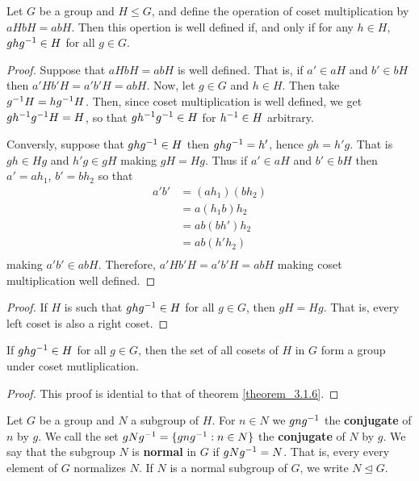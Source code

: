 \begin{theorem}\label{theorem_3.2.3}
  Let $G$ be a group and  $H \leq G$, and define the operation of coset
  multiplication by  $aHbH=abH$. Then this opertion is well defined if, and
  only if for any  $h \in H$,  $ghg^{-1} \in H$ for all $g \in G$.
\end{theorem}
\begin{proof}
  Suppose that $aHbH=abH$ is well defined. That is, if  $a' \in aH$ and $b'
  \in bH$ then  $a'Hb'H=a'b'H=abH$. Now, let  $g \in G$ and  $h \in H$. Then
  take $g^{-1}H=hg^{-1}H$. Then, since coset multiplication is well defined,
  we get $gh^{-1}g^{-1}H=H$, so that $gh^{-1}g^{-1} \in H$ for $h^{-1} \in
  H$ arbitrary.

  Conversly, suppose that $ghg^{-1} \in H$ then $ghg^{-1}=h'$, hence
  $gh=h'g$. That is  $gh \in Hg$ and  $h'g \in gH$ making  $gH=Hg$. Thus if
  $a' \in aH$ and $b' \in bH$ then $a'=ah_1$, $b'=bh_2$ so that
  \begin{align*}
    a'b'  &=  (ah_1)(bh_2)  \\
          &=  a(h_1b)h_2  \\
          &=  ab(bh')h_2  \\
          &=  ab(h'h_2) \\
  \end{align*}
   making $a'b' \in abH$.
  Therefore, $a'Hb'H=a'b'H=abH$ making coset multiplication well defined.
\end{proof}
\begin{proof}
  If $H$ is such that $ghg^{-1} \in H$ for all $g \in G$, then  $gH=Hg$. That
  is, every left coset is also a right coset.
\end{proof}
\begin{corollary}
  If $ghg^{-1} \in H$ for all $g \in G$, then the set of all cosets of  $H$
  in  $G$ form a group under coset mutliplication.
\end{corollary}
\begin{proof}
  This proof is idential to that of theorem \ref{theorem_3.1.6}.
\end{proof}

\begin{definition}
  Let $G$ be a group and $N$ a subgroup of  $H$. For  $n \in N$ we
  $gng^{-1}$ the \textbf{conjugate} of $n$ by  $g$. We call the set
  $gNg^{-1}=\{gng^{-1} : n \in N\}$ the \textbf{conjugate} of $N$ by $g$. We
  say that the subgroup $N$ is \textbf{normal} in $G$ if $gNg^{-1}=N$. That
  is, every every element of $G$ normalizes  $N$. If  $N$ is a normal subgroup
  of  $G$, we write  $N \unlhd G$.
\end{definition}

